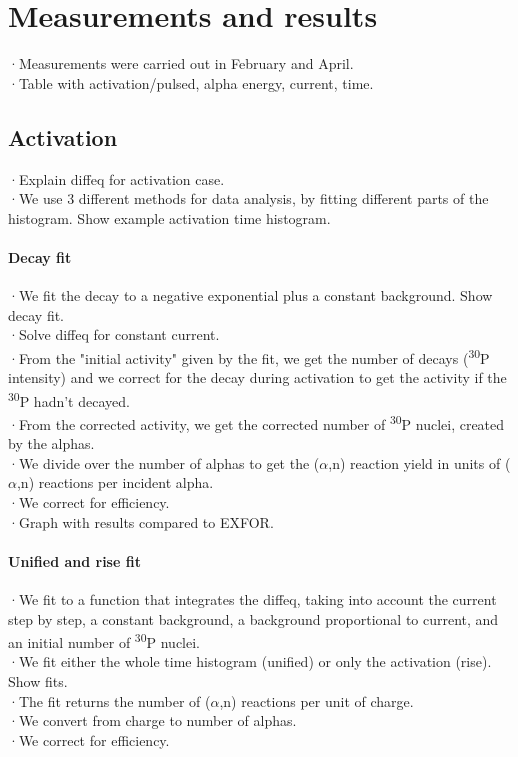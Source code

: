 \documentclass[a4paper,12pt]{report}
\newcommand{\an}{($\alpha$,n) }
\newcommand{\Piso}{\textsuperscript{30}P }
\begin{document}
\chapter{Measurements and results}
·Measurements were carried out in February and April.\\
·Table with activation/pulsed, alpha energy, current, time.\\

\section{Activation}
·Explain diffeq for activation case.\\
·We use 3 different methods for data analysis, by fitting different parts of the histogram. Show example activation time histogram.\\

\subsubsection{Decay fit}
·We fit the decay to a negative exponential plus a constant background. Show decay fit.\\
·Solve diffeq for constant current.\\
·From the "initial activity" given by the fit, we get the number of decays (\Piso intensity) and we correct for the decay during activation to get the activity if the \Piso hadn't decayed.\\
·From the corrected activity, we get the corrected number of \Piso nuclei, created by the alphas.\\
·We divide over the number of alphas to get the \an reaction yield in units of \an reactions per incident alpha.\\
·We correct for efficiency.\\

·Graph with results compared to EXFOR.\\

\subsubsection{Unified and rise fit}
·We fit to a function that integrates the diffeq, taking into account the current step by step, a constant background, a background proportional to current, and an initial number of \Piso nuclei.\\
·We fit either the whole time histogram (unified) or only the activation (rise). Show fits.\\
·The fit returns the number of \an reactions per unit of charge.\\
·We convert from charge to number of alphas.\\
·We correct for efficiency.\\
\end{document}

